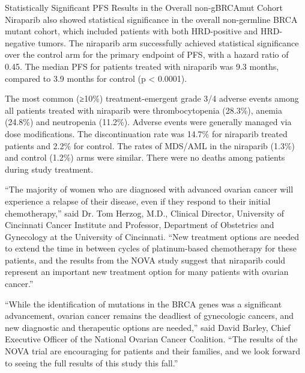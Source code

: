 \documentclass[letterpaper,12pt,english]{sphinxmanual}
\begin{document}
Statistically Significant PFS Results in the Overall non-gBRCAmut Cohort
Niraparib also showed statistical significance in the overall non-germline BRCA mutant cohort, which included patients with both HRD-positive and HRD-negative tumors. The niraparib arm successfully achieved statistical significance over the control arm for the primary endpoint of PFS, with a hazard ratio of 0.45. The median PFS for patients treated with niraparib was 9.3 months, compared to 3.9 months for control (p \textless{} 0.0001).

The most common (≥10\%) treatment-emergent grade 3/4 adverse events among all patients treated with niraparib were thrombocytopenia (28.3\%), anemia (24.8\%) and neutropenia (11.2\%). Adverse events were generally managed via dose modifications. The discontinuation rate was 14.7\% for niraparib treated patients and 2.2\% for control. The rates of MDS/AML in the niraparib (1.3\%) and control (1.2\%) arms were similar. There were no deaths among patients during study treatment.

``The majority of women who are diagnosed with advanced ovarian cancer will experience a relapse of their disease, even if they respond to their initial chemotherapy,'' said Dr. Tom Herzog, M.D., Clinical Director, University of Cincinnati Cancer Institute and Professor, Department of Obstetrics and Gynecology at the University of Cincinnati. ``New treatment options are needed to extend the time in between cycles of platinum-based chemotherapy for these patients, and the results from the NOVA study suggest that niraparib could represent an important new treatment option for many patients with ovarian cancer.''

``While the identification of mutations in the BRCA genes was a significant advancement, ovarian cancer remains the deadliest of gynecologic cancers, and new diagnostic and therapeutic options are needed,'' said David Barley, Chief Executive Officer of the National Ovarian Cancer Coalition. ``The results of the NOVA trial are encouraging for patients and their families, and we look forward to seeing the full results of this study this fall.''
\end{document}
